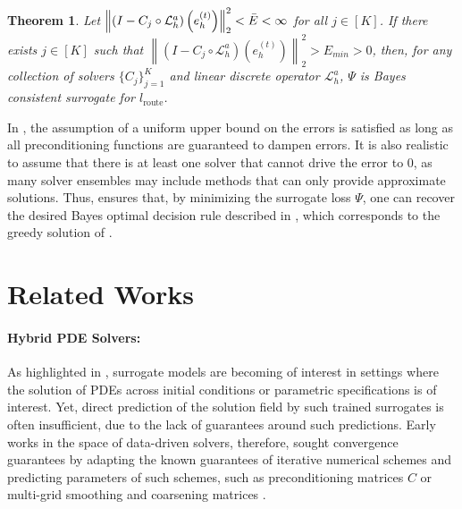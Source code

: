 \documentclass{article} %
\newtheorem{theorem}{Theorem}[section]
\begin{document}
\begin{theorem} \label{th:consistency}
    Let $\left\|\left( I - C_{j} \circ \mathcal{L}_{h}^a\right)\left(e^{(t)}_h\right)\right\|^2_2 < \Bar{E} < \infty$  for all $j \in [K]$. If there exists $j\in [K]$ such that $\left\|\left( I - C_{j} \circ \mathcal{L}_{h}^a\right)\left(e^{(t)}_h\right)\right\|^2_2 > E_{min} > 0$, then, for any collection of solvers $\{C_j\}_{j= 1}^K$ and linear discrete operator $\mathcal{L}_h^a$, $\Psi$ is Bayes consistent surrogate for $l_{\text{route}}$.
\end{theorem}
In , the assumption of a uniform upper bound on the errors is satisfied as long as all preconditioning functions are guaranteed to dampen errors. It is also realistic to assume that there is at least one solver that cannot drive the error to $0$, as many solver ensembles may include methods that can only provide approximate solutions. Thus,  ensures that, by minimizing the surrogate loss $\Psi$, one can recover the desired Bayes optimal decision rule described in , which corresponds to the greedy solution of .






\section{Related Works}

\paragraph{Hybrid PDE Solvers:}
As highlighted in , surrogate models are becoming of interest in settings where the solution of PDEs across initial conditions or parametric specifications is of interest. Yet, direct prediction of the solution field by such trained surrogates is often insufficient, due to the lack of guarantees around such predictions. Early works in the space of data-driven solvers, therefore, sought convergence guarantees by adapting the known guarantees of iterative numerical schemes and predicting parameters of such schemes, such as preconditioning matrices $C$ or multi-grid smoothing and coarsening matrices \citep{taghibakhshi2021optimization,caldana2024deep,kopanivcakova2025deeponet,huang2022learning,katrutsa2020black}. 
\end{document}
